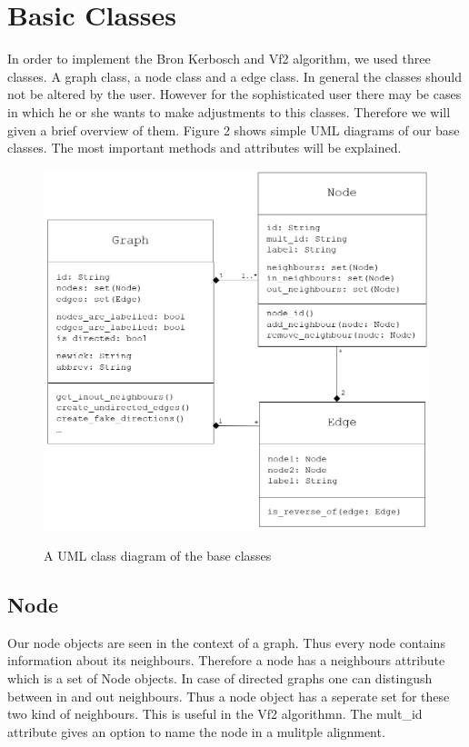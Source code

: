 \documentclass{SeminarV2}
\begin{document}
\section{Basic Classes}
In order to implement the Bron Kerbosch and Vf2 algorithm, we used three classes.
A graph class, a node class and a edge class. In general the classes should not be altered
by the user. However for the sophisticated user there may be cases in which he or she
wants to make adjustments to this classes. Therefore we will given a brief
overview of them. Figure 2 shows simple UML diagrams of our base classes. The most important methods and attributes will be explained.
\begin{figure}
	{\centering
	\includegraphics[scale=1.7]{multivitamin_basic_uml.png}
}

  \caption{A UML class diagram of the base classes}
\end{figure}
\subsection{Node}
Our node objects are seen in the context of a graph. Thus every node contains information about
its neighbours. Therefore a node has a neighbours attribute which is a set of Node objects.
In case of directed graphs one can distingush between in and out neighbours. Thus a node object has a seperate set for these two kind of neighbours. This is useful in the Vf2 algorithmn. The mult\_id attribute gives an option to name the node in a mulitple alignment.
\end{document}
